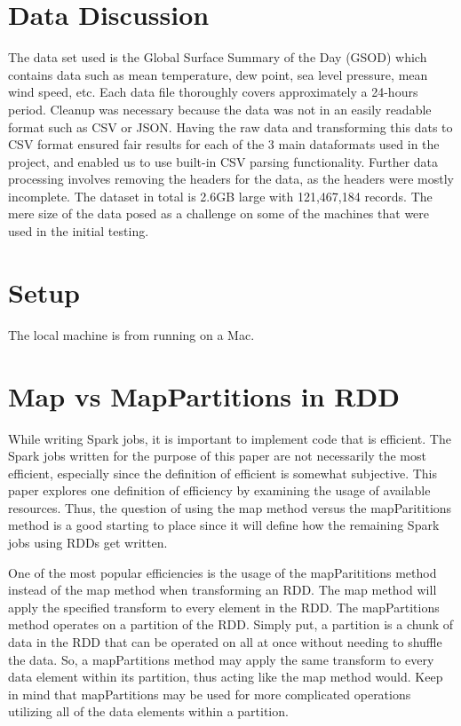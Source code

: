 \documentclass[conference]{IEEEtran}
\begin{document}
\section{Data Discussion}
The data set used is the Global Surface Summary of the Day (GSOD) which contains data such as mean temperature, dew point, sea level pressure, mean wind speed, etc.
Each data file thoroughly covers approximately a 24-hours period.\cite{b7}
Cleanup was necessary because the data was not in an easily readable format such as CSV or JSON. Having the raw data and transforming this dats to CSV format ensured fair results for each of the 3 main dataformats used in the project, and enabled us to use built-in CSV parsing functionality.
Further data processing involves removing the headers for the data, as the headers were mostly incomplete.
The dataset in total is 2.6GB large with 121,467,184 records. The mere size of the data posed as a challenge on some of the machines that were used in the initial testing.


\section{Setup}
The local machine is from running on a Mac.

\section{Map vs MapPartitions in RDD}
While writing Spark jobs, it is important to implement code that is efficient.
The Spark jobs written for the purpose of this paper are not necessarily the most efficient, especially since the definition of efficient is somewhat subjective.
This paper explores one definition of efficiency by examining the usage of available resources.
Thus, the question of using the map method versus the mapParititions method is a good starting to place since it will define how the remaining Spark jobs using RDDs get written.

One of the most popular efficiencies is the usage of the mapParititions method instead of the map method when transforming an RDD.
The map method will apply the specified transform to every element in the RDD.
The mapPartitions method operates on a partition of the RDD.
Simply put, a partition is a chunk of data in the RDD that can be operated on all at once without needing to shuffle the data.
So, a mapPartitions method may apply the same transform to every data element within its partition, thus acting like the map method would.
Keep in mind that mapPartitions may be used for more complicated operations utilizing all of the data elements within a partition.
\end{document}
